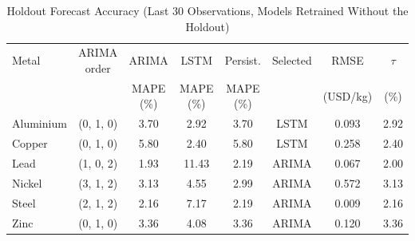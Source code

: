\begin{table}[!t]
\caption{Holdout Forecast Accuracy (Last 30 Observations, Models Retrained Without the Holdout)}
\label{tab:holdout}
\centering
\footnotesize
\setlength{\tabcolsep}{3pt}
\begin{tabular}{lccccccc}
\hline
Metal & ARIMA order & ARIMA & LSTM & Persist. & Selected & RMSE & $\tau$ \\
 & & MAPE (\%) & MAPE (\%) & MAPE (\%) & & (USD/kg) & (\%) \\
\hline
Aluminium & (0, 1, 0) & 3.70 & 2.92 & 3.70 & LSTM & 0.093 & 2.92 \\
Copper & (0, 1, 0) & 5.80 & 2.40 & 5.80 & LSTM & 0.258 & 2.40 \\
Lead & (1, 0, 2) & 1.93 & 11.43 & 2.19 & ARIMA & 0.067 & 2.00 \\
Nickel & (3, 1, 2) & 3.13 & 4.55 & 2.99 & ARIMA & 0.572 & 3.13 \\
Steel & (2, 1, 2) & 2.16 & 7.17 & 2.19 & ARIMA & 0.009 & 2.16 \\
Zinc & (0, 1, 0) & 3.36 & 4.08 & 3.36 & ARIMA & 0.120 & 3.36 \\
\hline
\end{tabular}
\end{table}
